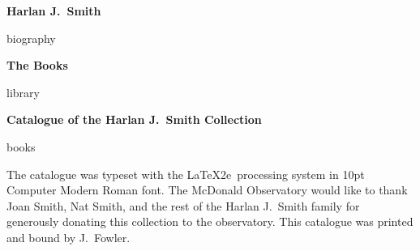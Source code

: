 \documentclass[letterpaper]{book}
\begin{document}
\vspace*{1 in}
\centerline{\Large \bf Harlan J.\ Smith}
\bigskip\bigskip
{biography}
\newpage

\vspace*{1 in}
\centerline{\Large \bf The Books}
\bigskip\bigskip
{library}
\newpage

\printbibliography

\mainmatter
\begin{center}
  {\Large \bf Catalogue of the Harlan J.\ Smith Collection}
\end{center}
\bigskip
{books}


\backmatter

  \printindex[author]

\begin{colophon}
  The catalogue was typeset with the \LaTeX2e\ processing system in
  10pt Computer Modern Roman font. The McDonald Observatory would like
  to thank Joan Smith, Nat Smith, and the rest of the Harlan J.~Smith
  family for generously donating this collection to the observatory.
  This catalogue was printed and bound by J.~Fowler.
\end{colophon}
\end{document}

